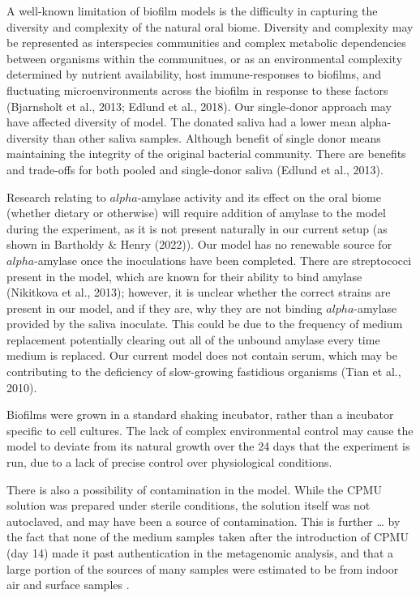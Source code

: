 \documentclass[
]{article}
\begin{document}
A well-known limitation of biofilm models is the difficulty in capturing
the diversity and complexity of the natural oral biome. Diversity and
complexity may be represented as interspecies communities and complex
metabolic dependencies between organisms within the communitues, or as
an environmental complexity determined by nutrient availability, host
immune-responses to biofilms, and fluctuating microenvironments across
the biofilm in response to these factors (Bjarnsholt et al., 2013;
Edlund et al., 2018). Our single-donor approach may have affected
diversity of model. The donated saliva had a lower mean alpha-diversity
than other saliva samples. Although benefit of single donor means
maintaining the integrity of the original bacterial community. There are
benefits and trade-offs for both pooled and single-donor saliva (Edlund
et al., 2013).

Research relating to \(alpha\)-amylase activity and its effect on the
oral biome (whether dietary or otherwise) will require addition of
amylase to the model during the experiment, as it is not present
naturally in our current setup (as shown in Bartholdy \& Henry (2022)).
Our model has no renewable source for \(alpha\)-amylase once the
inoculations have been completed. There are streptococci present in the
model, which are known for their ability to bind amylase (Nikitkova et
al., 2013); however, it is unclear whether the correct strains are
present in our model, and if they are, why they are not binding
\(alpha\)-amylase provided by the saliva inoculate. This could be due to
the frequency of medium replacement potentially clearing out all of the
unbound amylase every time medium is replaced. Our current model does
not contain serum, which may be contributing to the deficiency of
slow-growing fastidious organisms (Tian et al., 2010).

Biofilms were grown in a standard shaking incubator, rather than a
incubator specific to cell cultures. The lack of complex environmental
control may cause the model to deviate from its natural growth over the
24 days that the experiment is run, due to a lack of precise control
over physiological conditions.

There is also a possibility of contamination in the model. While the
CPMU solution was prepared under sterile conditions, the solution itself
was not autoclaved, and may have been a source of contamination. This is
further \ldots{} by the fact that none of the medium samples taken after
the introduction of CPMU (day 14) made it past authentication in the
metagenomic analysis, and that a large portion of the sources of many
samples were estimated to be from indoor air and surface samples .
\end{document}
